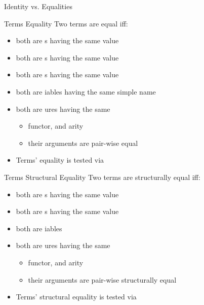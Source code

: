\documentclass[handout]{beamer}
\begin{document}
\begin{frame}[allowframebreaks]{Identity vs. Equalities}
    \begin{block}{Terms Equality}
        Two terms are \alert{equal} iff:
        \begin{itemize}
            \item both are s having the same value
            \item both are s having the same value
            \item both are s having the same value
            \item both are iables having the same \alert{simple} name
            \item both are ures having the same
            \begin{itemize}
                \item functor, and arity
                \item their arguments are pair-wise \alert{equal}
            \end{itemize}
        \end{itemize}
    \end{block}
    \begin{itemize}
        \item Terms' \alert{equality} is tested via 
    \end{itemize}

    \framebreak

    \begin{block}{Terms Structural Equality}
        Two terms are \alert{structurally equal} iff:
        \begin{itemize}
            \item both are s having the same value
            \item both are s having the same value
            \item both are iables
            \item both are ures having the same
            \begin{itemize}
                \item functor, and arity
                \item their arguments are pair-wise \alert{structurally equal}
            \end{itemize}
        \end{itemize}
    \end{block}
    \begin{itemize}
        \item Terms' \alert{structural equality} is tested via 
    \end{itemize}

    \framebreak

\end{frame}
\end{document}
